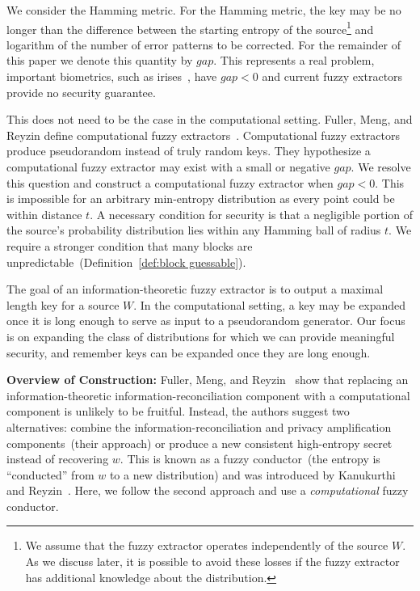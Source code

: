 \documentclass[11pt]{article}
\newcommand{\defref}[1]{\mbox{Definition~\ref{#1}}}
\newcommand{\Hoo}{\mathrm{H}_\infty}
\begin{document}
We consider the Hamming metric.  For the Hamming metric, the key may be no longer than the difference between the starting entropy of the source\footnote{We assume that the fuzzy extractor operates independently of the source $W$.  As we discuss later, it is possible to avoid these losses if the fuzzy extractor has additional knowledge about the distribution.} and logarithm of the number of error patterns to be corrected. For the remainder of this paper we denote this quantity by $gap$.  This represents a real problem, important biometrics, such as irises~\cite{daugman2004}, have $gap <0$ and current fuzzy extractors provide no security guarantee.
 

This does not need to be the case in the computational setting.  Fuller, Meng, and Reyzin define computational fuzzy extractors~\cite{fuller2013computational}.  Computational fuzzy extractors produce pseudorandom instead of truly random keys.  They hypothesize a computational fuzzy extractor may exist with a small or negative $gap$.  We resolve this question and construct a computational fuzzy extractor when $gap<0$.  This is impossible for an arbitrary min-entropy distribution as every point could be within distance $t$.  A necessary condition for security is that a negligible portion of the source's probability distribution lies within any Hamming ball of radius $t$.  We require a stronger condition that many blocks are unpredictable~(\defref{def:block guessable}).  

The goal of an information-theoretic fuzzy extractor is to output a maximal length key for a source $W$.  
In the computational setting, a key may be expanded once it is long enough to serve as input to a pseudorandom generator.  Our focus is on expanding the class of distributions for which we can provide meaningful security, and remember keys can be expanded once they are long enough.

\textbf{Overview of Construction:}  Fuller, Meng, and Reyzin~\cite[Corollary 3.8, Theorem 3.10]{fuller2013computational} show that replacing an information-theoretic information-reconciliation component with a computational component is unlikely to be fruitful.  Instead, the authors suggest two alternatives: combine the information-reconciliation and privacy amplification components~(their approach) or produce a new consistent high-entropy secret instead of recovering $w$.  This is known as a fuzzy conductor~(the entropy is ``conducted'' from $w$ to a new distribution) and was introduced by Kanukurthi and Reyzin~\cite{KanukurthiR09}.  Here, we follow the second approach and use a \emph{computational} fuzzy conductor.
\end{document}
